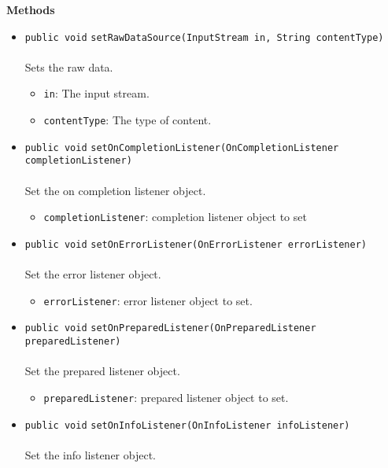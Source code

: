 \textbf{\sffamily Methods}
\begin{itemize}
\item \lstinline|public void| \lstinline|setRawDataSource|\lstinline|(InputStream in, String contentType)|\\ \\[-0.6em]
Sets the raw data.
\begin{itemize}
\item \lstinline|in|: The input stream.
\item \lstinline|contentType|: The type of content.
\end{itemize}



\item \lstinline|public void| \lstinline|setOnCompletionListener|\lstinline|(OnCompletionListener completionListener)|\\ \\[-0.6em]
Set the on completion listener object.
\begin{itemize}
\item \lstinline|completionListener|: completion listener object to set
\end{itemize}



\item \lstinline|public void| \lstinline|setOnErrorListener|\lstinline|(OnErrorListener errorListener)|\\ \\[-0.6em]
Set the error listener object.
\begin{itemize}
\item \lstinline|errorListener|: error listener object to set.
\end{itemize}



\item \lstinline|public void| \lstinline|setOnPreparedListener|\lstinline|(OnPreparedListener preparedListener)|\\ \\[-0.6em]
Set the prepared listener object.
\begin{itemize}
\item \lstinline|preparedListener|: prepared listener object to set.
\end{itemize}



\item \lstinline|public void| \lstinline|setOnInfoListener|\lstinline|(OnInfoListener infoListener)|\\ \\[-0.6em]
Set the info listener object.




\end{itemize}

